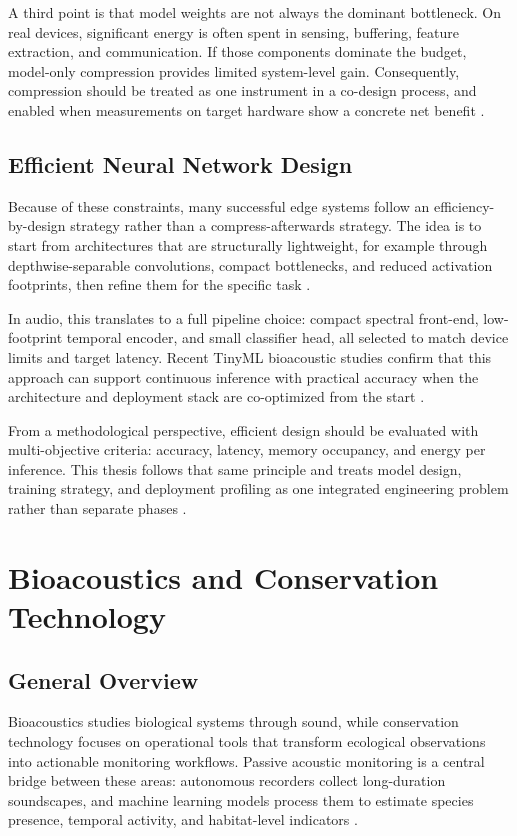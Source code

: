 \documentclass[a4paper,singleside,12pt]{report} %
\begin{document}
	A third point is that model weights are not always the dominant bottleneck. On real devices, significant energy is often spent in sensing, buffering, feature extraction, and communication. If those components dominate the budget, model-only compression provides limited system-level gain. Consequently, compression should be treated as one instrument in a co-design process, and enabled when measurements on target hardware show a concrete net benefit \cite{tao2022energy,singh2023edgeaisurvey}.
	\subsection{Efficient Neural Network Design}
	Because of these constraints, many successful edge systems follow an efficiency-by-design strategy rather than a compress-afterwards strategy. The idea is to start from architectures that are structurally lightweight, for example through depthwise-separable convolutions, compact bottlenecks, and reduced activation footprints, then refine them for the specific task \cite{mobilenetv2,matchboxnet2020,phinets2022}.

	In audio, this translates to a full pipeline choice: compact spectral front-end, low-footprint temporal encoder, and small classifier head, all selected to match device limits and target latency. Recent TinyML bioacoustic studies confirm that this approach can support continuous inference with practical accuracy when the architecture and deployment stack are co-optimized from the start \cite{sabbella2022alwayson,tinychirp2024,paissan2022scalableaudio}.

	From a methodological perspective, efficient design should be evaluated with multi-objective criteria: accuracy, latency, memory occupancy, and energy per inference. This thesis follows that same principle and treats model design, training strategy, and deployment profiling as one integrated engineering problem rather than separate phases \cite{abadade2023tinymlsurvey,singh2023edgeaisurvey}.

	\section{Bioacoustics and Conservation Technology}
	\subsection{General Overview}
	Bioacoustics studies biological systems through sound, while conservation technology focuses on operational tools that transform ecological observations into actionable monitoring workflows. Passive acoustic monitoring is a central bridge between these areas: autonomous recorders collect long-duration soundscapes, and machine learning models process them to estimate species presence, temporal activity, and habitat-level indicators \cite{nietomora2023systematic,birdnet2021}.
\end{document}
